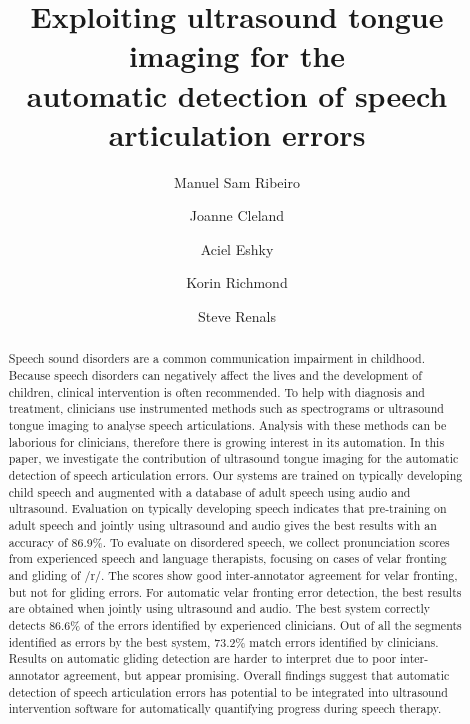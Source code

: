 \documentclass[final,5p,times,twocolumn,11pt]{elsarticle}
\begin{document}
\begin{frontmatter}


\title{Exploiting ultrasound tongue imaging for the\\automatic detection of speech articulation errors}

\author[a]{Manuel Sam Ribeiro}

\author[b]{Joanne Cleland}

\author[a]{Aciel Eshky}

\author[a]{Korin Richmond}

\author[a]{Steve Renals}

\address[a]{The Centre for Speech Technology Research, University of Edinburgh, UK}
\address[b]{Psychological Sciences and Health, University of Strathclyde, UK}


\begin{abstract}
Speech sound disorders are a common communication impairment in childhood.
Because speech disorders can negatively affect the lives and the development of children, clinical intervention is often recommended.
To help with diagnosis and treatment, clinicians use instrumented methods such as spectrograms or ultrasound tongue imaging to analyse speech articulations.
Analysis with these methods can be laborious for clinicians, therefore there is growing interest in its automation. 
In this paper, we investigate the contribution of ultrasound tongue imaging for the automatic detection of speech articulation errors.
Our systems are trained on typically developing child speech and augmented with a database of adult speech using audio and ultrasound.
Evaluation on typically developing speech indicates that pre-training on adult speech and jointly using ultrasound and audio gives 
the best results with an accuracy of 86.9\%.
To evaluate on disordered speech, we collect pronunciation scores from experienced speech and language therapists, focusing on
cases of velar fronting and gliding of /r/.
The scores show good inter-annotator agreement for velar fronting, but not for gliding errors.
For automatic velar fronting error detection, the best results are obtained when jointly using ultrasound and audio.
The best system correctly detects 86.6\% of the errors identified by experienced clinicians.
Out of all the segments identified as errors by the best system, 73.2\% match errors identified by clinicians.
Results on automatic gliding detection are harder to interpret due to poor inter-annotator agreement, but appear promising.
Overall findings suggest that automatic detection of speech articulation errors has potential to be integrated into ultrasound intervention software for automatically quantifying progress during speech therapy.
\end{abstract}


\end{frontmatter}
\end{document}
